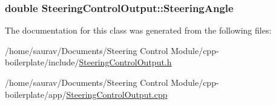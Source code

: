 \subsubsection[{\texorpdfstring{Steering\+Angle}{SteeringAngle}}]{\setlength{\rightskip}{0pt plus 5cm}double Steering\+Control\+Output\+::\+Steering\+Angle\hspace{0.3cm}{\ttfamily [private]}}\hypertarget{classSteeringControlOutput_aa13642c9701cdb34c8013dab7f475baf}{}\label{classSteeringControlOutput_aa13642c9701cdb34c8013dab7f475baf}


The documentation for this class was generated from the following files\+:\begin{DoxyCompactItemize}
\item 
/home/saurav/\+Documents/\+Steering Control Module/cpp-\/boilerplate/include/\hyperlink{SteeringControlOutput_8h}{Steering\+Control\+Output.\+h}\item 
/home/saurav/\+Documents/\+Steering Control Module/cpp-\/boilerplate/app/\hyperlink{SteeringControlOutput_8cpp}{Steering\+Control\+Output.\+cpp}\end{DoxyCompactItemize}
